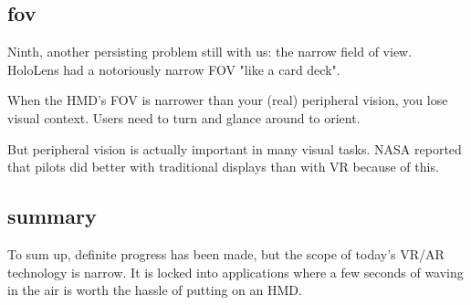 \subsection{fov}
Ninth, another persisting problem still with us: the narrow field of view. HoloLens had a notoriously narrow FOV "like a card deck". 

When the HMD's FOV is narrower than your (real) peripheral vision, you lose visual context. Users need to turn and glance around to orient. 

But peripheral vision is actually important in many visual tasks. NASA reported that pilots did better with traditional displays than with VR because of this. 


\subsection{summary}
To sum up, definite progress has been made, but the scope of today's VR/AR technology is narrow. It is locked into applications where a few seconds of waving in the air is worth the hassle of putting on an HMD.


